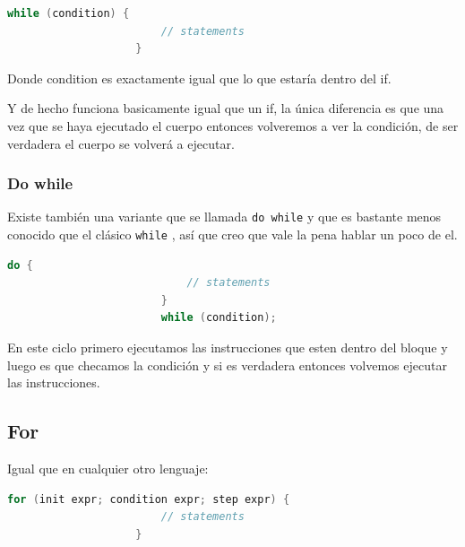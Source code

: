 \documentclass[12pt, fleqn]{report}                             %
\theoremstyle{break}                                            %
\newcommand{\textCode}[1]  { \texttt{#1} }                      %
\begin{document}
                \begin{lstlisting}[language=C++, gobble=20]
                    while (condition) {
                        // statements
                    }
                \end{lstlisting}

                Donde condition es exactamente igual que lo que estaría dentro
                del if.

                Y de hecho funciona basicamente igual que un if, la única diferencia
                es que una vez que se haya ejecutado el cuerpo entonces volveremos a ver la 
                condición, de ser verdadera el cuerpo se volverá a ejecutar.

                \subsubsection{Do while}

                    Existe también una variante que se llamada \textCode{do while} y que 
                    es bastante menos conocido que el clásico \textCode{while}, así que creo
                    que vale la pena hablar un poco de el.

                    \begin{lstlisting}[language=C++, gobble=24]
                        do {
                            // statements
                        }
                        while (condition);
                    \end{lstlisting}

                    En este ciclo primero ejecutamos las instrucciones que esten dentro del bloque
                    y luego es que checamos la condición y si es verdadera entonces volvemos 
                    ejecutar las instrucciones.

            \subsection{For}

                Igual que en cualquier otro lenguaje:
                \begin{lstlisting}[language=C++, gobble=20]
                    for (init expr; condition expr; step expr) {
                        // statements
                    }
                \end{lstlisting}
\end{document}
